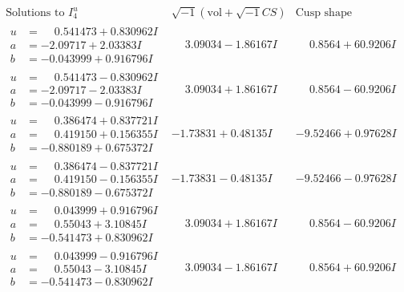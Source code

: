 \documentclass[1p]{elsarticle_modified}
\theoremstyle{definition}
\newcommand{\I}{\sqrt{-1}}
\begin{document}
$$\begin{array}{c|c|c}  
\text{Solutions to }I^u_{4}& \I (\text{vol} + \sqrt{-1}CS) & \text{Cusp shape}\\
 \hline 
\begin{aligned}
u &= \phantom{-}0.541473 + 0.830962 I \\
a &= -2.09717 + 2.03383 I \\
b &= -0.043999 + 0.916796 I\end{aligned}
 & \phantom{-}3.09034 - 1.86167 I & \phantom{-}0.8564 + 60.9206 I \\ \hline\begin{aligned}
u &= \phantom{-}0.541473 - 0.830962 I \\
a &= -2.09717 - 2.03383 I \\
b &= -0.043999 - 0.916796 I\end{aligned}
 & \phantom{-}3.09034 + 1.86167 I & \phantom{-}0.8564 - 60.9206 I \\ \hline\begin{aligned}
u &= \phantom{-}0.386474 + 0.837721 I \\
a &= \phantom{-}0.419150 + 0.156355 I \\
b &= -0.880189 + 0.675372 I\end{aligned}
 & -1.73831 + 0.48135 I & -9.52466 + 0.97628 I \\ \hline\begin{aligned}
u &= \phantom{-}0.386474 - 0.837721 I \\
a &= \phantom{-}0.419150 - 0.156355 I \\
b &= -0.880189 - 0.675372 I\end{aligned}
 & -1.73831 - 0.48135 I & -9.52466 - 0.97628 I \\ \hline\begin{aligned}
u &= \phantom{-}0.043999 + 0.916796 I \\
a &= \phantom{-}0.55043 + 3.10845 I \\
b &= -0.541473 + 0.830962 I\end{aligned}
 & \phantom{-}3.09034 + 1.86167 I & \phantom{-}0.8564 - 60.9206 I \\ \hline\begin{aligned}
u &= \phantom{-}0.043999 - 0.916796 I \\
a &= \phantom{-}0.55043 - 3.10845 I \\
b &= -0.541473 - 0.830962 I\end{aligned}
 & \phantom{-}3.09034 - 1.86167 I & \phantom{-}0.8564 + 60.9206 I \\ \hline\begin{aligned}

\end{aligned}
\end{array}$$
\end{document}
